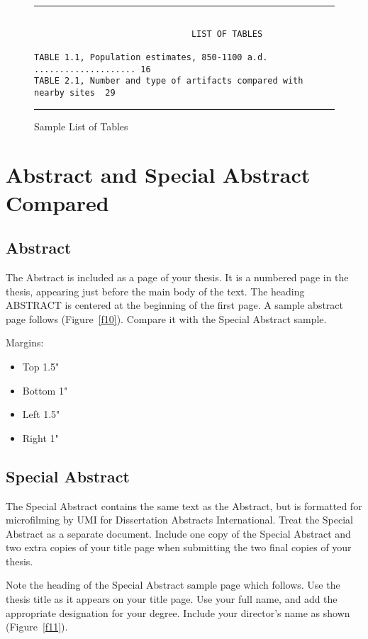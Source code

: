 \documentclass[draft]{ua-thesis}
\begin{document}
\begin{figure}
\hrule
\begin{verbatim}

                               LIST OF TABLES

TABLE 1.1, Population estimates, 850-1100 a.d. .................... 16
TABLE 2.1, Number and type of artifacts compared with nearby sites  29

\end{verbatim}
\hrule
\caption{Sample List of Tables} \label{f9}
\end{figure}


\section{Abstract and Special Abstract Compared}

\subsection{Abstract}

The Abstract is included as a page of your thesis. It is a numbered page in
the thesis, appearing just before the main body of the text. The heading
ABSTRACT is centered at the beginning of the first page. A sample abstract
page follows (Figure~\ref{f10}). Compare it with the Special Abstract
sample.

Margins:
\begin{itemize}
   \item Top 1.5"
   \item Bottom 1"
   \item Left 1.5"
   \item Right 1"
\end{itemize}


\subsection{Special Abstract}

The Special Abstract contains the same text as the Abstract, but is
formatted for microfilming by UMI for Dissertation Abstracts International.
Treat the Special Abstract as a separate document. Include one copy of the
Special Abstract and two extra copies of your title page when submitting the
two final copies of your thesis.

Note the heading of the Special Abstract sample page which follows. Use the
thesis title as it appears on your title page. Use your full name, and add
the appropriate designation for your degree. Include your director's name as
shown (Figure~\ref{f11}).
\end{document}
